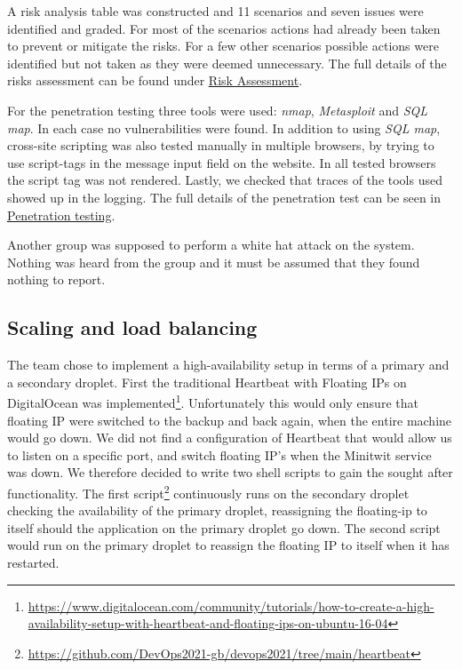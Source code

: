 \noindent
A risk analysis table was constructed and 11 scenarios and seven issues were identified and graded. For most of the scenarios actions had already been taken to prevent or mitigate the risks. For a few other scenarios possible actions were identified but not taken as they were deemed unnecessary. The full details of the risks assessment can be found under \underline{\href{https://github.com/DevOps2021-gb/devops2021/wiki/Risk-assesment}{Risk Assessment}}.

For the penetration testing three tools were used: \textit{nmap}, \textit{Metasploit} and \textit{SQL map}. In each case no vulnerabilities were found. In addition to using \textit{SQL map}, cross-site scripting was also tested manually in multiple browsers, by trying to use script-tags in the message input field on the website. In all tested browsers the script tag was not rendered. Lastly, we checked that traces of the tools used showed up in the logging. The full details of the penetration test can be seen in \underline{\href{https://github.com/DevOps2021-gb/devops2021/wiki/Penetration-testing}{Penetration testing}}.

Another group was supposed to perform a white hat attack on the system. Nothing was heard from the group and it must be assumed that they found nothing to report.%

\subsection{Scaling and load balancing}\label{subsection:scaling} 
The team chose to implement a high-availability setup in terms of a primary and a secondary droplet. First the traditional Heartbeat with Floating IPs on DigitalOcean was implemented\footnote{\url{https://www.digitalocean.com/community/tutorials/how-to-create-a-high-availability-setup-with-heartbeat-and-floating-ips-on-ubuntu-16-04}}. Unfortunately this would only ensure that floating IP were switched to the backup and back again, when the entire machine would go down. We did not find a configuration of Heartbeat that would allow us to listen on a specific port, and switch floating IP's when the Minitwit service was down. We therefore decided to write two shell scripts to gain the sought after functionality. The first script\footnote{\url{https://github.com/DevOps2021-gb/devops2021/tree/main/heartbeat}} continuously runs on the secondary droplet checking the availability of the primary droplet, reassigning the floating-ip to itself should the application on the primary droplet go down. The second script would run on the primary droplet to reassign the floating IP to itself when it has restarted.